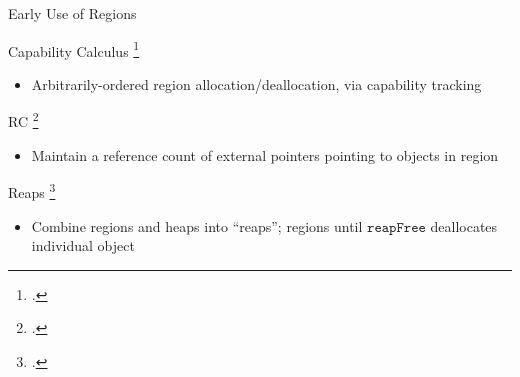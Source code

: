 \documentclass[aspectratio=169]{beamer}
\begin{document}
\begin{frame}{Early Use of Regions}
    \footnotesize{
Capability Calculus \footcite{crary_typed_1999}
    \vspace{-0.1in}
    \begin{itemize}
        \item Arbitrarily-ordered region allocation/deallocation, via capability tracking 
    \end{itemize}
\pause
RC \footcite{gay_language_2001}
    \vspace{-0.1in}
   \begin{itemize}
     \item Maintain a reference count of external pointers pointing to objects in region %
   \end{itemize}
\pause
Reaps \footcite{berger_reconsidering_2002}
    \vspace{-0.1in}
   \begin{itemize}
     \item Combine regions and heaps into ``reaps''; regions until $\texttt{reapFree}$ deallocates individual object
   \end{itemize}

}
\end{frame}
\end{document}
